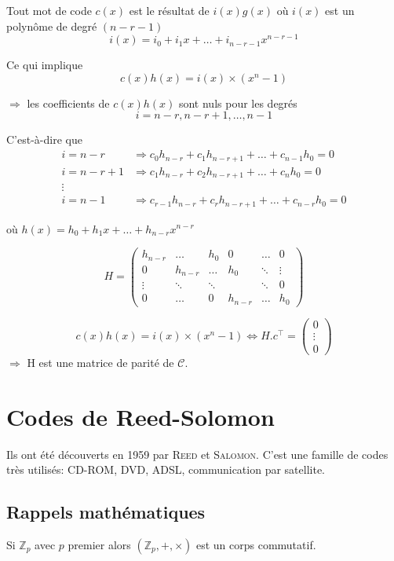 \documentclass[a4paper,10pt,twocolumn]{article}
\theoremstyle{break}
\newcommand{\code}[1]{\mathcal{#1}}
\newcommand{\C}{\code{C}}
\newcommand{\Zn}[1]{\mathbb{Z}_{#1}}
\newcommand{\Zp}{\Zn{p}}
\begin{document}
Tout mot de code $c(x)$ est le résultat de $i(x)g(x)$ où $i(x)$ est un polynôme de degré $(n-r-1)$
$$ i(x) = i_0 + i_1x + \ldots + i_{n-r-1}x^{n-r-1} $$

Ce qui implique 
 $$c(x)h(x) = i(x) \times (x^n-1)$$

$\Rightarrow$ les coefficients de $c(x)h(x)$ sont nuls pour les degrés 
 $$i = n-r, n-r+1, \dots, n-1$$

C'est-à-dire que 
$$\begin{array}{cl}
 i=n-r & \Rightarrow c_0 h_{n-r} + c_1 h_{n-r+1} + \ldots + c_{n-1} h_0 = 0 \\
 i=n-r+1 & \Rightarrow c_1 h_{n-r} + c_2 h_{n-r+1} + \ldots + c_{n} h_0 = 0 \\
 \vdots & \\
 i=n-1 & \Rightarrow c_{r-1} h_{n-r} + c_r h_{n-r+1} + \ldots + c_{n-r} h_0 = 0 
\end{array}$$

où $h(x) = h_0 + h_1x + \ldots + h_{n-r} x^{n-r}$

$$ H = 
\begin{pmatrix}
 h_{n-r} & \ldots & h_0 & 0 & \ldots & 0 \\
 0 & h_{n-r} & \ldots & h_0 & \ddots  & \vdots \\
 \vdots & \ddots & \ddots & & \ddots & 0 \\
 0 & \ldots & 0 & h_{n-r} & \ldots & h_0
\end{pmatrix}
$$

$$ c(x)h(x) = i(x) \times (x^n-1) \Leftrightarrow H.c^\top = \begin{pmatrix} 0 \\ \vdots \\ 0 \end{pmatrix} $$
$\Rightarrow$ H est une matrice de parité de $\C$.

\section{Codes de Reed-Solomon}

Ils ont été découverts en 1959 par \textsc{Reed} et \textsc{Salomon}. 
C'est une famille de codes très utilisés: CD-ROM, DVD, ADSL, communication par satellite.

\subsection{Rappels mathématiques}
Si $\Zp$ avec $p$ premier alors $(\Zp,+,\times)$ est un corps commutatif.
\end{document}
